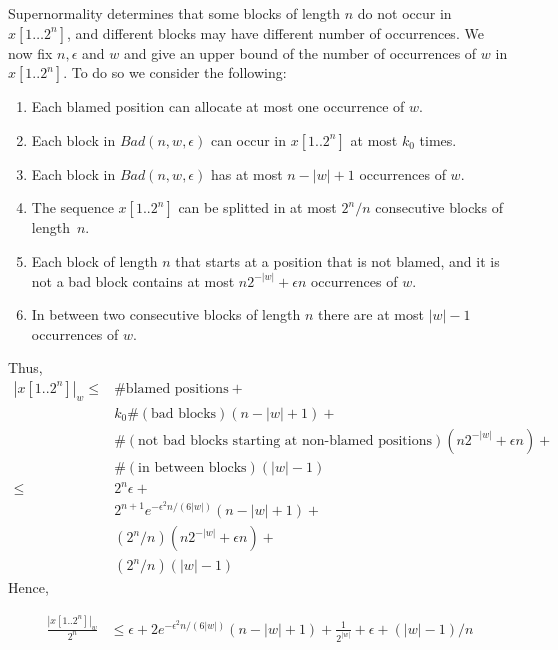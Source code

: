 \documentclass[11pt,a4paper]{tesis}
\begin{document}
Supernormality determines that  some blocks of length $n$
do not occur in $x[1\dots  2^n]$, and different blocks may 
have different number of occurrences.
We now fix $ n, \epsilon$ and $w$ and give an upper bound of  the number of occurrences of $w$ in 
$x[1 .. 2^n]$. To do so we consider the following:
\begin{enumerate}
\item Each blamed position can allocate at most one occurrence of $w$.
\item Each block in $Bad(n, w, \epsilon)$ can occur in $x[1.. 2^n]$
 at most $k_0$ times.
\item Each block in $Bad(n, w, \epsilon)$ has at most $n-|w|+1$ occurrences of $w$.
\item The sequence $x[1..  2^n]$ can be splitted in at most $ 2^n/n$ consecutive blocks
of length~$n$.  
\item Each block  of length $n$ that starts at a position that is not blamed,  and it is not a bad block
 contains at most $n 2^{-|w|} + \epsilon n $ occurrences of $w$.
\item In between two consecutive blocks of length $n$ there are at most $|w|-1$ occurrences of $w$.
\end{enumerate}
Thus,
\begin{align*}
|x[1.. 2^n]|_w \leq &
 \#\text{blamed positions} +
\\& k_0 \#(\text{bad blocks}) (n-|w|+1)+
\\& \#(\text{not bad blocks starting at non-blamed positions}) (n 2^{-|w|} + \epsilon n)+
\\&  \#(\text{in between blocks})  (|w|-1)
\\
\leq& 2^n \epsilon + 
\\& 2^{n+1} e^{-\epsilon^2 n/(6|w|)} (n-|w|+1)+
\\&  ( 2^n /n) (n 2^{-|w|} + \epsilon n)+
\\&  ( 2^n/n) (|w|-1)
\end{align*}
Hence, 

\begin{align*}
  \frac{|x[1..  2^n]|_w }{ 2^n}&\leq \epsilon + 2 e^{-\epsilon^2 n/(6|w|)}  (n-|w|+1) + \frac{1}{2^{|w|}} + \epsilon + (|w|-1)/n
  \end{align*}
\end{document}
